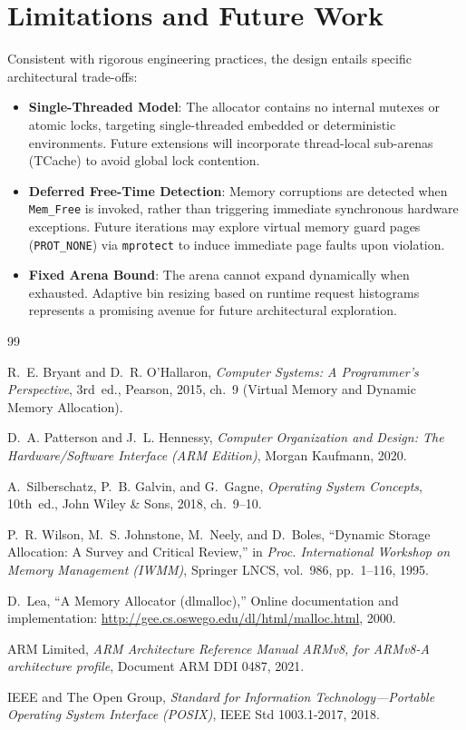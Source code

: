 \documentclass[a4paper,11pt]{report}
\begin{document}
\section{Limitations and Future Work}
Consistent with rigorous engineering practices, the design entails specific architectural trade-offs:
\begin{itemize}
    \item \textbf{Single-Threaded Model}: The allocator contains no internal mutexes or atomic locks, targeting single-threaded embedded or deterministic environments. Future extensions will incorporate thread-local sub-arenas (TCache) to avoid global lock contention.
    \item \textbf{Deferred Free-Time Detection}: Memory corruptions are detected when \texttt{Mem\_Free} is invoked, rather than triggering immediate synchronous hardware exceptions. Future iterations may explore virtual memory guard pages (\texttt{PROT\_NONE}) via \texttt{mprotect} to induce immediate page faults upon violation.
    \item \textbf{Fixed Arena Bound}: The arena cannot expand dynamically when exhausted. Adaptive bin resizing based on runtime request histograms represents a promising avenue for future architectural exploration.
\end{itemize}

\begin{thebibliography}{99}

R.~E. Bryant and D.~R. O'Hallaron, 
\emph{Computer Systems: A Programmer's Perspective}, 3rd~ed., 
Pearson, 2015, ch.~9 (Virtual Memory and Dynamic Memory Allocation).

D.~A. Patterson and J.~L. Hennessy, 
\emph{Computer Organization and Design: The Hardware/Software Interface (ARM Edition)}, 
Morgan Kaufmann, 2020.

A.~Silberschatz, P.~B. Galvin, and G.~Gagne, 
\emph{Operating System Concepts}, 10th~ed., 
John Wiley \& Sons, 2018, ch.~9--10.

P.~R. Wilson, M.~S. Johnstone, M.~Neely, and D.~Boles, 
``Dynamic Storage Allocation: A Survey and Critical Review,'' 
in \emph{Proc. International Workshop on Memory Management (IWMM)}, 
Springer LNCS, vol.~986, pp.~1--116, 1995.

D.~Lea, 
``A Memory Allocator (dlmalloc),'' 
Online documentation and implementation: \url{http://gee.cs.oswego.edu/dl/html/malloc.html}, 2000.

ARM Limited, 
\emph{ARM Architecture Reference Manual ARMv8, for ARMv8-A architecture profile}, 
Document ARM DDI 0487, 2021.

IEEE and The Open Group, 
\emph{Standard for Information Technology---Portable Operating System Interface (POSIX)}, 
IEEE Std 1003.1-2017, 2018.

\end{thebibliography}
\end{document}
